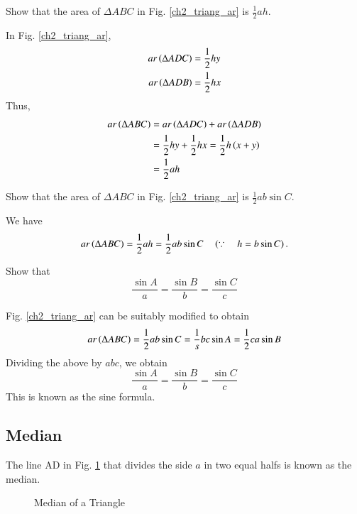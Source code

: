 \begin{problem}
	Show that the area of $\Delta ABC$ in Fig. 	\ref{ch2_triang_ar}	is $\frac{1}{2}ah$.
\end{problem}

\proof In Fig. \ref{ch2_triang_ar},
\begin{align}
ar\left(\Delta ADC\right) &= \frac{1}{2}hy \\
ar\left(\Delta ADB\right) &= \frac{1}{2}hx 
\end{align}
Thus,
\begin{align}
ar\left(\Delta ABC\right) &= ar\left(\Delta ADC\right) + ar\left(\Delta ADB\right) \\
&= \frac{1}{2}hy + \frac{1}{2}hx = \frac{1}{2}h\left(x+y\right) \\
&= \frac{1}{2}ah
\end{align}
\begin{problem}
	Show that the area of $\Delta ABC$ in Fig. 	\ref{ch2_triang_ar}	is $\frac{1}{2}ab \sin C$.
\end{problem}
\proof We have
%
\begin{equation}
ar\left(\Delta ABC\right) = \frac{1}{2}ah = \frac{1}{2}ab\sin C \quad \left(\because \quad h = b \sin C\right).
\end{equation}
%
\begin{problem}
	Show that 
	\begin{equation}
	\frac{\sin A}{a} = \frac{\sin B}{b} = \frac{\sin C}{c}
	\end{equation}
\end{problem}
\proof Fig. \ref{ch2_triang_ar} can be suitably modified to obtain 
\begin{equation}
ar\left(\Delta ABC\right) = \frac{1}{2}ab\sin C = \frac{1}{s}bc\sin A = \frac{1}{2}ca\sin B
\end{equation}
Dividing the above by $abc$, we obtain
	\begin{equation}
	\frac{\sin A}{a} = \frac{\sin B}{b} = \frac{\sin C}{c}
	\end{equation}
This is known as the sine formula.	
%
\subsection{Median}
\begin{definition}
	The line AD in Fig. \ref{ch2_median_def} that divides the side $a$ in two equal halfs is known as the median.
\end{definition}
\begin{figure}[!ht]
	\begin{center}
		
		\resizebox{\columnwidth}{!}{}
	\end{center}
	\caption{Median of a Triangle}
	\label{ch2_median_def}	
\end{figure}

